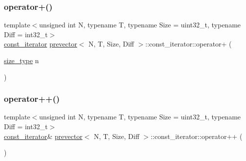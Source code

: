 \subsubsection{\texorpdfstring{operator+()}{operator+()}}
{\footnotesize\ttfamily template$<$unsigned int N, typename T, typename Size = uint32\+\_\+t, typename Diff = int32\+\_\+t$>$ \\
\mbox{\hyperlink{classprevector_1_1const__iterator}{const\+\_\+iterator}} \mbox{\hyperlink{classprevector}{prevector}}$<$ N, T, Size, Diff $>$\+::const\+\_\+iterator\+::operator+ (\begin{DoxyParamCaption}\item[{\mbox{\hyperlink{classprevector_a7e0da95e6d1c878f6eeb572f4fc12524}{size\+\_\+type}}}]{n }\end{DoxyParamCaption})\hspace{0.3cm}{\ttfamily [inline]}}

\mbox{\label{classprevector_1_1const__iterator_a4f634cfafc2c49e52172dafcb470db27}} 
\subsubsection{\texorpdfstring{operator++()}{operator++()}\hspace{0.1cm}{\footnotesize\ttfamily [1/2]}}
{\footnotesize\ttfamily template$<$unsigned int N, typename T, typename Size = uint32\+\_\+t, typename Diff = int32\+\_\+t$>$ \\
\mbox{\hyperlink{classprevector_1_1const__iterator}{const\+\_\+iterator}}\& \mbox{\hyperlink{classprevector}{prevector}}$<$ N, T, Size, Diff $>$\+::const\+\_\+iterator\+::operator++ (\begin{DoxyParamCaption}{ }\end{DoxyParamCaption})\hspace{0.3cm}{\ttfamily [inline]}}

\mbox{\label{classprevector_1_1const__iterator_a52a778f9a0f3556eab278698a1c97683}} 
